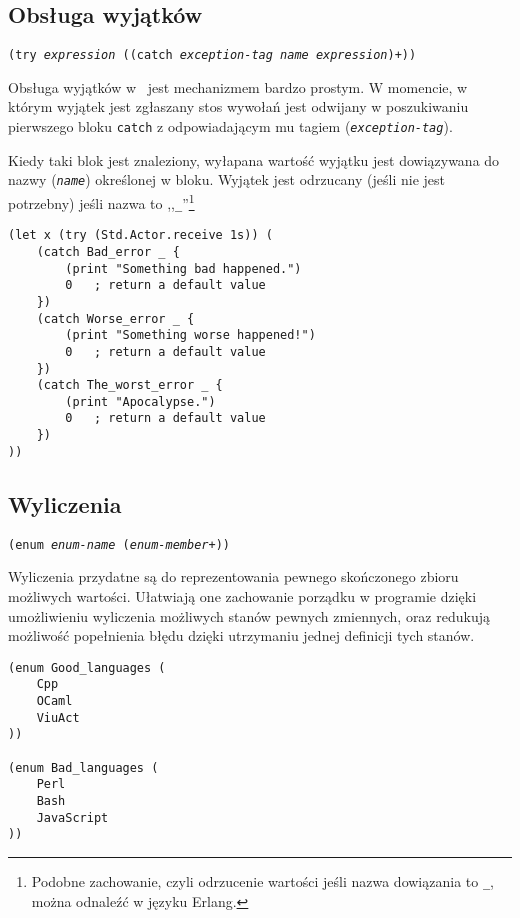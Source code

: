 \subsection{Obsługa wyjątków}

\texttt{(try \emph{expression} ((catch \emph{exception-tag} \emph{name} \emph{expression})+))}
\vspace{1em}

Obsługa wyjątków w \ViuAct\ jest mechanizmem bardzo prostym. W momencie, w którym wyjątek jest zgłaszany
stos wywołań jest odwijany w poszukiwaniu pierwszego bloku \texttt{catch} z odpowiadającym mu
tagiem (\texttt{\emph{exception-tag}}).

Kiedy taki blok jest znaleziony, wyłapana wartość wyjątku jest dowiązywana do nazwy (\texttt{\emph{name}})
określonej w bloku. Wyjątek jest odrzucany (jeśli nie jest potrzebny) jeśli nazwa to
,,\texttt{\_}''\footnote{Podobne zachowanie, czyli odrzucenie wartości jeśli nazwa dowiązania to
\texttt{\_}, można odnaleźć w języku Erlang.}

\begin{lstlisting}
(let x (try (Std.Actor.receive 1s)) (
    (catch Bad_error _ {
        (print "Something bad happened.")
        0   ; return a default value
    })
    (catch Worse_error _ {
        (print "Something worse happened!")
        0   ; return a default value
    })
    (catch The_worst_error _ {
        (print "Apocalypse.")
        0   ; return a default value
    })
))
\end{lstlisting}

\subsection{Wyliczenia}

\texttt{(enum \emph{enum-name} (\emph{enum-member}+))}
\newline

Wyliczenia przydatne są do reprezentowania pewnego skończonego zbioru możliwych wartości. Ułatwiają one
zachowanie porządku w programie dzięki umożliwieniu wyliczenia możliwych stanów pewnych zmiennych, oraz
redukują możliwość popełnienia błędu dzięki utrzymaniu jednej definicji tych stanów.

\begin{lstlisting}
(enum Good_languages (
    Cpp
    OCaml
    ViuAct
))

(enum Bad_languages (
    Perl
    Bash
    JavaScript
))
\end{lstlisting}

